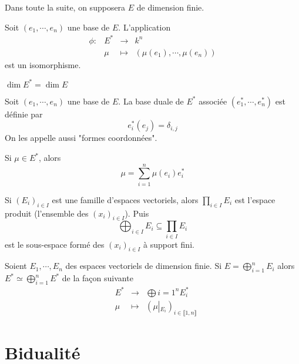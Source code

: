 Dans toute la suite, on supposera $E$ de dimension finie.

\begin{thm}
    Soit $(e_1, \cdots , e_n)$ une base de $E$. L'application  \[
    \begin{array}{rrcl}
        \phi:& E^* & \longrightarrow & k^n \\
             & \mu & \longmapsto & \displaystyle (\mu(e_1), \cdots , \mu(e_n))
    \end{array}
    \] 
    est un isomorphisme.
\end{thm}

\begin{cor}
$\dim E^*=\dim E$
\end{cor}

\begin{cor}
    Soit $(e_1, \cdots , e_n)$ une base de $E$. La base duale de $E^*$ associée  $(e_1^*, \cdots , e_n^*)$ est définie par \[
        e_i^*(e_j)=\delta_{i,j}
    \] 
    On les appelle aussi "formes coordonnées".
\end{cor}

\begin{rem}
Si $\mu \in  E^*$, alors \[
    \mu = \sum_{i=1}^{n} \mu(e_i)e_i^*
\] 
\end{rem}

\begin{rem}[Notation]
    Si $(E_i)_{i \in  I}$ est une famille d'espaces vectoriels, alors $\prod_{i \in  I}E_i$ est l'espace produit (l'ensemble des $(x_i)_{i \in  I}$). Puis \[
        \bigoplus_{i \in  I}E_i \subseteq \prod_{i \in  I} E_i
    \] 
    est le sous-espace formé des $(x_i)_{i \in  I}$ à support fini.
\end{rem}

Soient $E_1, \cdots , E_n$ des espaces vectoriels de dimension finie. Si  $\displaystyle E = \bigoplus_{i=1}^nE_i$ alors $E^*\simeq \displaystyle \bigoplus_{i=1}^n E^*$ de la façon suivante  \[
\begin{array}{rrcl}
    & E^* & \longrightarrow & \displaystyle\bigoplus{i=1}^nE_i^* \\
    & \mu & \longmapsto & \displaystyle (\mu\left|_{E_i}\right.)_{i \in  \llbracket 1, n \rrbracket }
\end{array}
\] 

\section{Bidualité}

